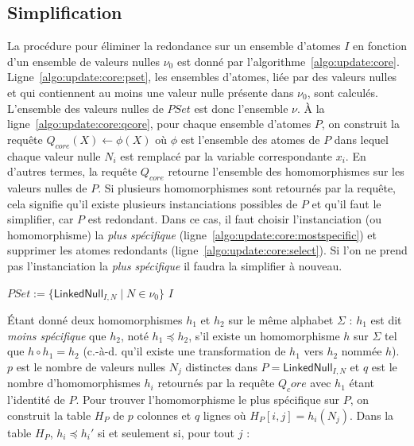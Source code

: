 \subsection{Simplification}
La procédure pour éliminer la redondance sur un ensemble d'atomes $I$ en fonction d'un ensemble de valeurs nulles $\nu_0$ est donné par l'algorithme~\ref{algo:update:core}.
Ligne~\ref{algo:update:core:pset}, les ensembles d'atomes, liée par des valeurs nulles et qui contiennent au moins une valeur nulle présente dans $\nu_0$, sont calculés.
L'ensemble des valeurs nulles de $PSet$ est donc l'ensemble $\nu$.
À la ligne~\ref{algo:update:core:qcore}, pour chaque ensemble d'atomes $P$, on construit la requête $Q_{core}(X) \gets \phi(X)$ où $\phi$ est l'ensemble des atomes de $P$ dans lequel chaque valeur nulle $N_i$ est remplacé par la variable correspondante $x_i$.
En d'autres termes, la requête $Q_{core}$ retourne l'ensemble des homomorphismes sur les valeurs nulles de $P$.
Si plusieurs homomorphismes sont retournés par la requête, cela signifie qu'il existe plusieurs instanciations possibles de $P$ et qu'il faut le simplifier, car $P$ est redondant.
Dans ce cas, il faut choisir l'instanciation (ou homomorphisme) la \textit{plus spécifique} (ligne~\ref{algo:update:core:mostspecific}) et supprimer les atomes redondants (ligne~\ref{algo:update:core:select}).
Si l'on ne prend pas l'instanciation la \textit{plus spécifique} il faudra la simplifier à nouveau.

\begin{algorithm}[ht]
	\caption{$\textsc{Simplify}(I, \nu_0)$}
	\label{algo:update:core}
	$PSet := \{\textsf{LinkedNull}_{I,N} \mid N \in \nu_0\}$\; \label{algo:update:core:pset}
	\Return $I$\;
\end{algorithm}

Étant donné deux homomorphismes $h_1$ et $h_2$ sur le même alphabet $\Sigma$ : $h_1$ est dit \textit{moins spécifique} que $h_2$, noté $h_1 \preceq h_2$, s'il existe un homomorphisme $h$ sur $\Sigma$ tel que $h \circ h_1 = h_2$ (c.-à-d. qu'il existe une transformation de $h_1$ vers $h_2$ nommée $h$).
$p$ est le nombre de valeurs nulles $N_j$ distinctes dans $P = \textsf{LinkedNull}_{I,N}$ et $q$ est le nombre d'homomorphismes $h_i$ retournés par la requête $Q_core$ avec $h_1$ étant l'identité de $P$.
Pour trouver l'homomorphisme le plus spécifique sur $P$, on construit la table $H_P$ de $p$ colonnes et $q$ lignes où $H_P[i, j] = h_i(N_j)$.
Dans la table $H_P$, $h_i \preceq h_i'$ si et seulement si, pour tout $j$ :

